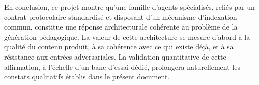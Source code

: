 \vspace{1cm}
En conclusion, ce projet montre qu'une famille d'agents
spécialisés, reliés par un contrat protocolaire standardisé et
disposant d'un mécanisme d'indexation commun, constitue une
réponse architecturale cohérente au problème de la génération
pédagogique. La valeur de cette architecture se mesure d'abord à
la qualité du contenu produit, à sa cohérence avec ce qui existe
déjà, et à sa résistance aux entrées adversariales. La validation
quantitative de cette affirmation, à l'échelle d'un banc d'essai
dédié, prolongera naturellement les constats qualitatifs établis
dans le présent document.
\newpage
